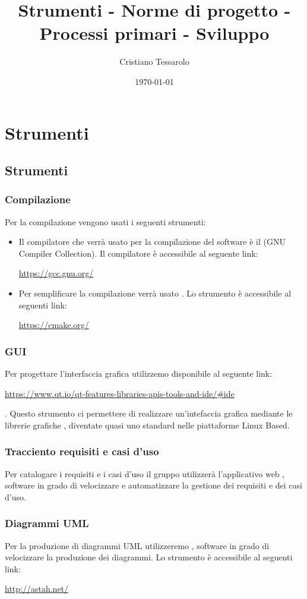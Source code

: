 \documentclass[openany,12pt,a4paper]{report}
\title{Strumenti - Norme di progetto - Processi primari - Sviluppo}
\author{Cristiano Tessarolo}
\date{\today}
\begin{document}
\chapter{Strumenti}

\section{Strumenti}
\subsection{Compilazione}
	Per la compilazione vengono usati i seguenti strumenti:
	\begin{itemize}
		\item Il compilatore che verrà usato per la compilazione del software è il  (GNU Compiler Collection). Il compilatore è accessibile al seguente link: \\ \centerline{\url{https://gcc.gnu.org/}}
		\item Per semplificare la compilazione verrà usato . Lo strumento è accessibile al seguenti link: \\ \centerline{\url{https://cmake.org/}}
	\end{itemize}
\subsection{GUI}
	Per progettare l'interfaccia grafica utilizzemo  disponibile al seguente link: \\  \centerline{\url{https://www.qt.io/qt-features-libraries-apis-tools-and-ide/#ide}}. Questo strumento ci permettere di realizzare un'intefaccia grafica mediante le librerie grafiche , diventate quasi uno standard nelle piattaforme Linux Based.
	
\subsection{Tracciento requisiti e casi d'uso}
	Per catalogare i requisiti e i casi d'uso il gruppo utilizzerà l'applicativo web , software in grado di velocizzare e automatizzare la gestione dei requisiti e dei casi d'uso.
	
	\subsection{Diagrammi UML}
	Per la produzione di diagrammi UML utilizzeremo , software in grado di velocizzare la produzione dei diagrammi. Lo strumento è accessibile al seguenti link: \\ \centerline{\url{http://astah.net/}}	
\end{document}
